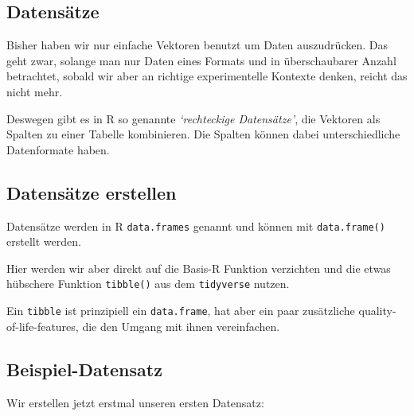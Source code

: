\documentclass[
]{book}
\begin{document}
\hypertarget{datensuxe4tze}{%
\subsection{Datensätze}\label{datensuxe4tze}}

Bisher haben wir nur einfache Vektoren benutzt um Daten auszudrücken. Das geht zwar, solange man nur Daten eines Formats und in überschaubarer Anzahl betrachtet, sobald wir aber an richtige experimentelle Kontexte denken, reicht das nicht mehr.

Deswegen gibt es in R so genannte \emph{`rechteckige Datensätze'}, die Vektoren als Spalten zu einer Tabelle kombinieren. Die Spalten können dabei unterschiedliche Datenformate haben.

\hypertarget{datensuxe4tze-erstellen}{%
\subsection{Datensätze erstellen}\label{datensuxe4tze-erstellen}}

Datensätze werden in R \texttt{data.frames} genannt und können mit \texttt{data.frame()} erstellt werden.

Hier werden wir aber direkt auf die Basis-R Funktion verzichten und die etwas hübschere Funktion \texttt{tibble()} aus dem \texttt{tidyverse} nutzen.

Ein \texttt{tibble} ist prinzipiell ein \texttt{data.frame}, hat aber ein paar zusätzliche quality-of-life-features, die den Umgang mit ihnen vereinfachen.

\hypertarget{beispiel-datensatz}{%
\subsection{Beispiel-Datensatz}\label{beispiel-datensatz}}

Wir erstellen jetzt erstmal unseren ersten Datensatz:
\end{document}
